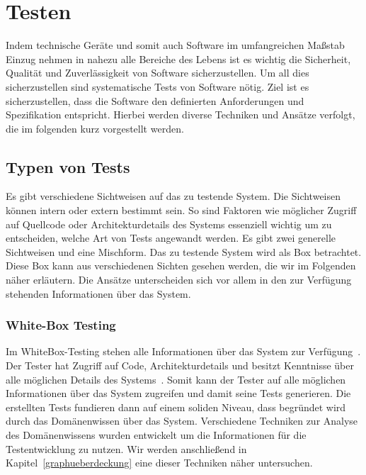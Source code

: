 \section{Testen}
\label{test}

Indem technische Geräte und somit auch Software im umfangreichen Maßstab Einzug nehmen in nahezu alle Bereiche des
Lebens ist es wichtig die Sicherheit, Qualität und Zuverlässigkeit von Software sicherzustellen. \cite[vgl. Introduction]{software-testing}
Um all dies sicherzustellen sind systematische Tests von Software nötig.
Ziel ist es sicherzustellen, dass die Software den definierten Anforderungen und Spezifikation entspricht.
Hierbei werden diverse Techniken und Ansätze verfolgt, die im folgenden kurz vorgestellt werden.

\subsection{Typen von Tests}

Es gibt verschiedene Sichtweisen auf das zu testende System.
Die Sichtweisen können intern oder extern bestimmt sein.
So sind Faktoren wie möglicher Zugriff auf Quellcode oder Architekturdetails des Systems essenziell wichtig um
zu entscheiden, welche Art von Tests angewandt werden.
Es gibt zwei generelle Sichtweisen und eine Mischform.
Das zu testende System wird als Box betrachtet.
Diese Box kann aus verschiedenen Sichten gesehen werden, die wir im Folgenden näher erläutern.
Die Ansätze unterscheiden sich vor allem in den zur Verfügung stehenden Informationen über das System.

\subsubsection{White-Box Testing}

Im WhiteBox-Testing stehen alle Informationen über das System zur Verfügung~\cite[vgl. 1.4.2 Code-Based Testing]{software-testing-craftmans}.
Der Tester hat Zugriff auf Code, Architekturdetails und besitzt Kenntnisse über alle möglichen Details des Systems~\cite[vgl. 1.4.2 Code-Based Testing]{software-testing-craftmans}.
Somit kann der Tester auf alle möglichen Informationen über das System zugreifen und damit seine Tests generieren.
Die erstellten Tests fundieren dann auf einem soliden Niveau, dass begründet wird durch das Domänenwissen über das System.
Verschiedene Techniken zur Analyse des Domänenwissens wurden entwickelt um die Informationen für die Testentwicklung zu nutzen.
Wir werden anschließend in Kapitel~\ref{graphueberdeckung} eine dieser Techniken näher untersuchen.

